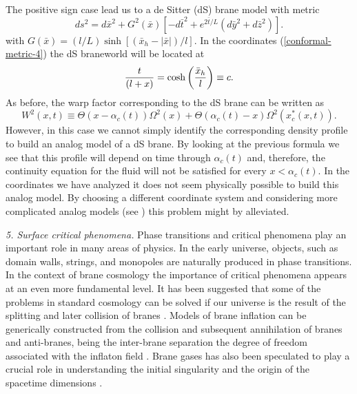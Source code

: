 \documentclass[a4paper,prl,showpacs,twocolumn]{revtex4}
\begin{document}
The positive sign case lead us to a de Sitter (dS)
brane model with metric \cite{dewolfe}
%
\[
ds^2 = d {\bar x}^2 + G^2({\bar x})
\left[ -d{\bar t}^2+ e^{2{\bar t} /L}
(d{\bar y}^2+d{\bar z}^2) \right].
\]
%
with $G({\bar x})=(l/L)\sinh[({\bar x}_h-|{\bar x}|)/l]$.
In the coordinates (\ref{conformal-metric-4}) the dS
braneworld will be located at
%
\begin{equation}
{t \over (l+x)}=\cosh\left({{\bar x}_h \over l}\right)\equiv c.
\end{equation}
%
As before, the warp factor corresponding to the dS brane can be written as
%
\[
W^2(x,t)\equiv \Theta(x-\alpha_c(t)) \Omega^2(x)+
\Theta(\alpha_c(t)-x)\Omega^2
\left(x_c^*(x,t)\right).
\]
%
However, in this case we cannot simply identify the corresponding
density profile to build an analog model of a dS brane.
By looking at the previous formula we see that this profile will
depend on time through $\alpha_c(t)$ and, therefore, the continuity
equation for the fluid will not be satisfied for every $x < \alpha_c(t)$.
In the coordinates we have analyzed it does not seem physically 
possible to build this analog model. 
By choosing a different coordinate system and considering more 
complicated analog models (see \cite{barcelo}) this problem might by 
alleviated. 


 
\noindent
{\it 5. Surface critical phenomena.} 
Phase transitions and critical phenomena play 
an important role in many areas of physics.
In the early universe, objects, such as domain walls, strings, and
monopoles are naturally produced in phase transitions.
In the context of brane cosmology the importance of 
critical phenomena appears at an even more fundamental level.
It has been suggested that some of the problems in standard
cosmology can be solved if our universe is the result of the splitting
and later collision of branes \cite{turok}.
Models of brane inflation can be generically constructed from the
collision and subsequent annihilation of branes and anti-branes, being
the inter-brane separation the degree of freedom associated with the
inflaton field \cite{DvaTye:1998}.
Brane gases has also been speculated to play a crucial role in
understanding the initial singularity and the origin of the spacetime
dimensions \cite{AleBraEas:2000}.
\end{document}
